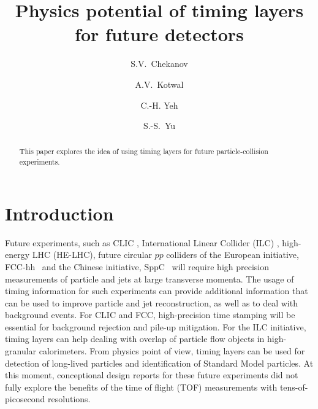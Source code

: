 \documentclass[final,1p,11pt]{elsarticle}
\begin{document}
\begin{frontmatter}

\title{
Physics potential of timing layers for future detectors}

\author[add1]{S.V.~Chekanov}

\author[addDuke]{A.V.~Kotwal}

\author[add3]{C.-H. Yeh}


\author[add3]{S.-S.~Yu}

\address[add1]{
HEP Division, Argonne National Laboratory,
9700 S.~Cass Avenue,
Argonne, IL 60439, USA.
}


\address[add3]{
Department of Physics and Center for High Energy and High Field Physics, 
National Central University, Chung-Li, Taoyuan City 32001, Taiwan
}

\address[addDuke]{
Department of Physics, Duke University, USA
}


\begin{abstract}
This paper explores the idea of using timing layers for 
future particle-collision experiments.
 
 
\end{abstract}

\begin{keyword}

\end{keyword}
\end{frontmatter}



\section{Introduction}

Future experiments, such as CLIC \cite{Linssen:1425915}, International Linear Collider (ILC) \cite{Behnke:2013xla}, high-energy LHC (HE-LHC),
future circular $pp$ colliders of the European initiative, FCC-hh~\cite{Benedikt:2206376} and the Chinese initiative, SppC~\cite{Tang:2015qga} will require high precision measurements of particle and jets 
at large transverse momenta. 
The usage of timing information for such experiments  can  provide additional 
information that can be used to improve particle and jet reconstruction, as well as to deal with background events.
For CLIC and FCC, high-precision time stamping will be essential for
background rejection and pile-up mitigation.
For the ILC initiative, timing layers can help dealing with overlap of particle flow objects in high-granular calorimeters.
From physics point of view, timing layers can be used for detection of long-lived particles and identification of Standard Model particles. 
At this moment, conceptional design reports for these future experiments did not fully explore
the benefits of the time of flight (TOF) measurements with tens-of-picosecond resolutions.
\end{document}
